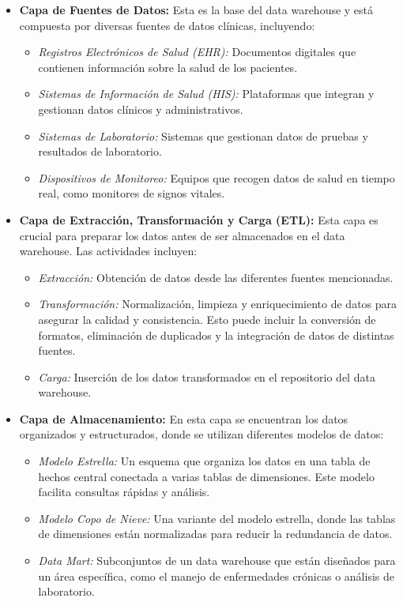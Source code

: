 \documentclass[12pt, a4paper, twoside]{article}
\begin{document}
	\begin{itemize}
		\item \textbf{Capa de Fuentes de Datos:} Esta es la base del data warehouse y está compuesta por diversas fuentes de datos clínicas, incluyendo:
		\begin{itemize}
			\item \textit{Registros Electrónicos de Salud (EHR):} Documentos digitales que contienen información sobre la salud de los pacientes.
			\item \textit{Sistemas de Información de Salud (HIS):} Plataformas que integran y gestionan datos clínicos y administrativos.
			\item \textit{Sistemas de Laboratorio:} Sistemas que gestionan datos de pruebas y resultados de laboratorio.
			\item \textit{Dispositivos de Monitoreo:} Equipos que recogen datos de salud en tiempo real, como monitores de signos vitales.
		\end{itemize}
		
		\item \textbf{Capa de Extracción, Transformación y Carga (ETL):} Esta capa es crucial para preparar los datos antes de ser almacenados en el data warehouse. Las actividades incluyen:
		\begin{itemize}
			\item \textit{Extracción:} Obtención de datos desde las diferentes fuentes mencionadas.
			\item \textit{Transformación:} Normalización, limpieza y enriquecimiento de datos para asegurar la calidad y consistencia. Esto puede incluir la conversión de formatos, eliminación de duplicados y la integración de datos de distintas fuentes.
			\item \textit{Carga:} Inserción de los datos transformados en el repositorio del data warehouse.
		\end{itemize}
		
		\item \textbf{Capa de Almacenamiento:} En esta capa se encuentran los datos organizados y estructurados, donde se utilizan diferentes modelos de datos:
		\begin{itemize}
			\item \textit{Modelo Estrella:} Un esquema que organiza los datos en una tabla de hechos central conectada a varias tablas de dimensiones. Este modelo facilita consultas rápidas y análisis.
			\item \textit{Modelo Copo de Nieve:} Una variante del modelo estrella, donde las tablas de dimensiones están normalizadas para reducir la redundancia de datos.
			\item \textit{Data Mart:} Subconjuntos de un data warehouse que están diseñados para un área específica, como el manejo de enfermedades crónicas o análisis de laboratorio.
		\end{itemize}
		

\end{itemize}
\end{document}
